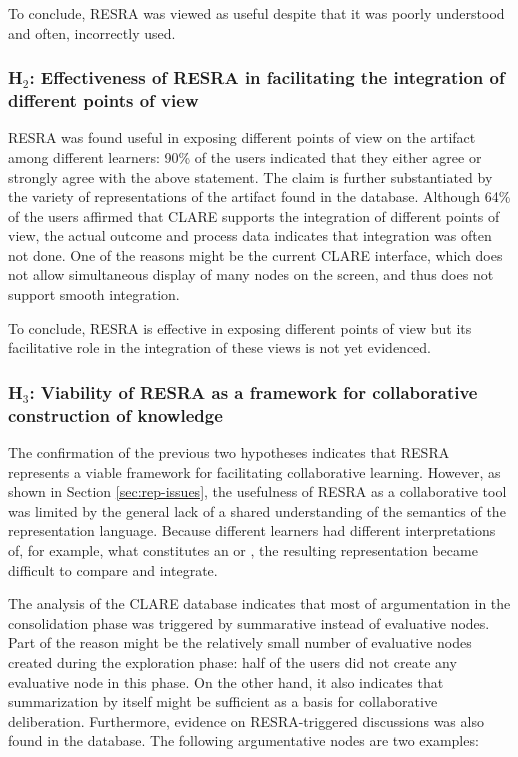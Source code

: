 To conclude, RESRA was viewed as useful despite that it was poorly
understood and often, incorrectly used.


\subsubsection{H\(_2\): Effectiveness of RESRA in facilitating the integration
of different points of view}

RESRA was found useful in exposing different points of view on the artifact
among different learners: 90\% of the users indicated that they either
agree or strongly agree with the above statement. The claim is further
substantiated by the variety of representations of the artifact found in
the database. Although 64\% of the users affirmed that CLARE supports the
integration of different points of view, the actual outcome and process
data indicates that integration was often not done. One of the reasons
might be the current CLARE interface, which does not allow simultaneous
display of many nodes on the screen, and thus does not support smooth
integration.

To conclude, RESRA is effective in exposing different points of view but
its facilitative role in the integration of these views is not yet
evidenced.


\subsubsection{H\(_3\): Viability of RESRA as a framework for collaborative
construction of knowledge}

The confirmation of the previous two hypotheses indicates that RESRA
represents a viable framework for facilitating collaborative learning.
However, as shown in Section \ref{sec:rep-issues}, the usefulness of RESRA
as a collaborative tool was limited by the general lack of a shared
understanding of the semantics of the representation language. Because
different learners had different interpretations of, for example, what
constitutes an  or , the
resulting representation became difficult to compare and integrate.

The analysis of the CLARE database indicates that most of argumentation in
the consolidation phase was triggered by summarative instead of evaluative
nodes. Part of the reason might be the relatively small number of
evaluative nodes created during the exploration phase: half of the users
did not create any evaluative node in this phase. On the other hand, it
also indicates that summarization by itself might be sufficient as a basis
for collaborative deliberation.  Furthermore, evidence on RESRA-triggered
discussions was also found in the database. The following argumentative
nodes are two examples:

